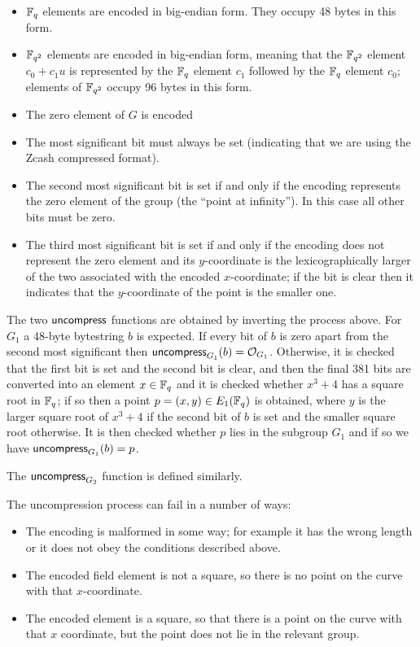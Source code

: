 \begin{itemize}
\item $\mathbb{F}_q$ elements are encoded in big-endian form. They occupy 48 bytes in this form.
\item $\mathbb{F}_{q^2}$ elements are encoded in big-endian form, meaning that the $\mathbb{F}_{q^2}$ element $c_0 + c_1u$
  is represented by the $\mathbb{F}_q$ element $c_1$ followed by the $\mathbb{F}_q$ element $c_0$;
  elements of $\mathbb{F}_{q^2}$ occupy 96 bytes in this form.
\item The zero element of $G$ is encoded
\item The most significant bit must always be set (indicating that we are using the Zcash compressed format).
\item The second most significant bit is set if and only if the encoding represents the zero
element of the group (the ``point at infinity'').  In this case all other bits
must be zero.
\item The third most significant bit is set if and only if the encoding does not represent the zero
element and its $y$-coordinate is the lexicographically larger of the two
associated with the encoded $x$-coordinate; if the bit is clear then it
indicates that the $y$-coordinate of the point is the smaller one.
\end{itemize}

The two $\mathsf{uncompress}$ functions are obtained by inverting the process above.
For $G_1$ a 48-byte bytestring $b$ is expected. If every bit of $b$ is zero
apart from the second most significant then $\mathsf{uncompress}_{G_1}(b)
= \mathcal{O}_{G_1}$.  Otherwise, it is checked that the first bit is set and
the second bit is clear, and then the final 381 bits are converted into an
element $x\in\mathbb{F}_q$ and it is checked whether $x^3+4$ has a square root in $\mathbb{F}_q$;
if so then a point $p=(x,y) \in E_1(\mathbb{F}_q)$ is obtained, where $y$ is the larger
square root of $x^3+4$ if the second bit of $b$ is set and the smaller square
root otherwise.  It is then checked whether $p$ lies in the subgroup $G_1$ and
if so we have $\mathsf{uncompress}_{G_1}(b)=p$.

\medskip
\noindent The $\mathsf{uncompress}_{G_2}$ function is defined similarly.

\medskip\noindent The uncompression process can fail in a number of ways:
\begin{itemize}
\item The encoding is malformed in some way; for example it has the wrong length or it does
not obey the conditions described above.
\item The encoded field element is not a square, so there is no point on the curve with that $x$-coordinate.
\item The encoded element is a square,  so that there is a point on the curve with that $x$ coordinate,
but the point does not lie in the relevant group.
\end{itemize}

